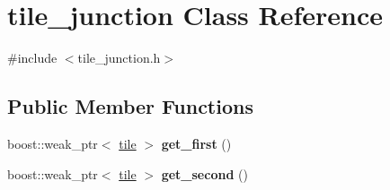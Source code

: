 \hypertarget{classtile__junction}{\section{tile\-\_\-junction Class Reference}
\label{classtile__junction}
}


{\ttfamily \#include $<$tile\-\_\-junction.\-h$>$}

\subsection*{Public Member Functions}
\begin{DoxyCompactItemize}
\item 
\hypertarget{classtile__junction_abe9fc83c0fc28c3ba07c59e30df8f8f1}{boost\-::weak\-\_\-ptr$<$ \hyperlink{classtile}{tile} $>$ {\bfseries get\-\_\-first} ()}\label{classtile__junction_abe9fc83c0fc28c3ba07c59e30df8f8f1}

\item 
\hypertarget{classtile__junction_a59dc0f6ef66d85874884a9259a2b85da}{boost\-::weak\-\_\-ptr$<$ \hyperlink{classtile}{tile} $>$ {\bfseries get\-\_\-second} ()}\label{classtile__junction_a59dc0f6ef66d85874884a9259a2b85da}


\end{DoxyCompactItemize}
